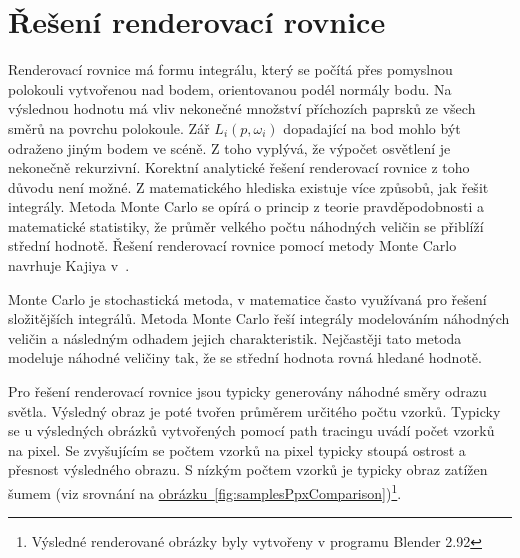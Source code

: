\documentclass[czech,master]{diploma}
\newcommand{\point}{p}
\newcommand{\inVec}{\omega_{i}}
\newcommand{\inRadiance}{L_i\left(\point,\inVec\right)}
\begin{document}
\section{Řešení renderovací rovnice}
Renderovací rovnice má formu integrálu, který se počítá přes pomyslnou polokouli vytvořenou nad bodem, orientovanou podél normály bodu. Na výslednou hodnotu má vliv nekonečné množství příchozích paprsků ze všech směrů na povrchu polokoule. Zář \(\inRadiance\) dopadající na bod mohlo být odraženo jiným bodem ve scéně. Z toho vyplývá, že výpočet osvětlení je nekonečně rekurzivní. Korektní analytické řešení renderovací rovnice z toho důvodu není možné. Z matematického hlediska existuje více způsobů, jak řešit integrály. Metoda Monte Carlo se opírá o princip z teorie pravděpodobnosti a matematické statistiky, že průměr velkého počtu náhodných veličin se přiblíží střední hodnotě. Řešení renderovací rovnice pomocí metody Monte Carlo navrhuje Kajiya v~\cite{KajiyaRenderEq}. \par
Monte Carlo je stochastická metoda, v matematice často využívaná pro řešení složitějších integrálů. Metoda Monte Carlo řeší integrály modelováním náhodných veličin a následným odhadem jejich charakteristik. Nejčastěji tato metoda modeluje náhodné veličiny tak, že se střední hodnota rovná hledané hodnotě\cite{MonteCarlo}.\par
Pro řešení renderovací rovnice jsou typicky generovány náhodné směry odrazu světla. Výsledný obraz je poté tvořen průměrem určitého počtu vzorků. Typicky se u výsledných obrázků vytvořených pomocí path tracingu uvádí počet vzorků na pixel. Se zvyšujícím se počtem vzorků na pixel typicky stoupá ostrost a přesnost výsledného obrazu. S nízkým počtem vzorků je typicky obraz zatížen šumem (viz srovnání na \hyperref[fig:samplesPpxComparison]{obrázku~\ref{fig:samplesPpxComparison}})\footnote{Výsledné renderované obrázky byly vytvořeny v programu Blender 2.92}.
\end{document}
